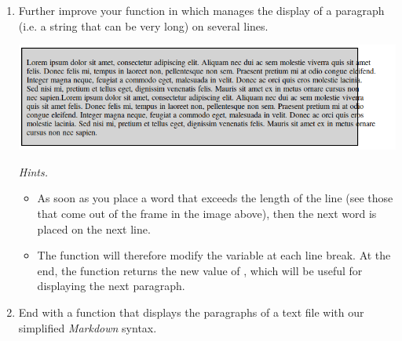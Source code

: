 \documentclass[11pt,class=report,crop=false]{standalone}
\begin{document}
\begin{activite}
\begin{enumerate}
   
  \item Further improve your function in  which manages the display of a paragraph (i.e. a string that can be very long) on several lines.
  
\begin{center}
\includegraphics[scale=0.55]{screen-markdown-6-en}
\end{center}   
 
   \emph{Hints.}
  \begin{itemize}
    \item As soon as you place a word that exceeds the length of the line (see those that come out of the frame in the image above), then the next word is placed on the next line.
    
    \item The function will therefore modify the variable  at each line break. At the end, the function returns the new value of , which will be useful for displaying the next paragraph.
 
   \end{itemize}    
   
   \item End with a  function that displays the paragraphs of a text file with our simplified \emph{Markdown} syntax.
\end{enumerate} 
\end{activite}

\end{document}
